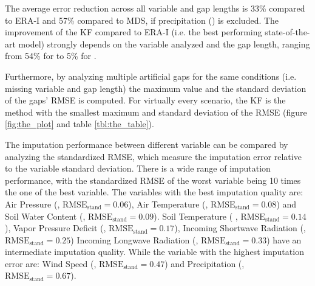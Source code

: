 \documentclass{article}
\begin{document}
The average error reduction across all variable and gap lengths is 33\% compared to ERA-I and 57\% compared to MDS, if precipitation () is excluded. The improvement of the KF compared to ERA-I (i.e. the best performing state-of-the-art model) strongly depends on the variable analyzed and the gap length, ranging from 54\% for  to 5\% for .

Furthermore, by analyzing multiple artificial gaps for the same conditions (i.e. missing variable and gap length) the maximum value and the standard deviation of the gaps' RMSE is computed. For virtually every scenario, the KF is the method with the smallest maximum and standard deviation of the RMSE (figure \ref{fig:the_plot} and table \ref{tbl:the_table}). 

The imputation performance between different variable can be compared by analyzing the standardized RMSE, which measure the imputation error relative to the variable standard deviation. There is a wide range of imputation performance, with the standardized RMSE of the worst variable being 10 times the one of the best variable.
The variables with the best imputation quality are:
Air Pressure (, $\text{RMSE}_{\text{stand}} = 0.06$),
Air Temperature (, $\text{RMSE}_{\text{stand}} = 0.08$)
and Soil Water Content (, $\text{RMSE}_{\text{stand}} = 0.09$).
Soil Temperature ( , $\text{RMSE}_{\text{stand}} = 0.14$),
Vapor Pressure Deficit (, $\text{RMSE}_{\text{stand}} = 0.17$),
Incoming Shortwave Radiation (, $\text{RMSE}_{\text{stand}} = 0.25$)
Incoming Longwave Radiation (, $\text{RMSE}_{\text{stand}} = 0.33$)
have an intermediate imputation quality.
While the variable with the highest imputation error are: Wind Speed (, $\text{RMSE}_{\text{stand}} = 0.47$) and  Precipitation (, $\text{RMSE}_{\text{stand}} = 0.67$).
\end{document}
